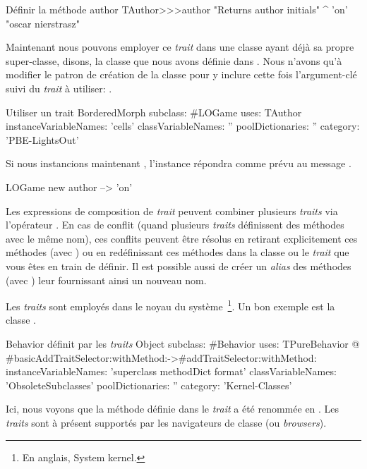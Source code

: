\documentclass[a4paper,10pt,twoside]{book}
\begin{document}
\begin{method}[author]{Définir la méthode author}
TAuthor>>>author
    "Returns author initials"
	^ 'on'    "oscar nierstrasz"
\end{method}

\noindent
Maintenant nous pouvons employer ce \emph{trait} dans une classe ayant déjà sa propre super-classe, disons, la classe  que nous avons définie dans .
Nous n'avons qu'à modifier le patron de création de la classe  pour y inclure cette fois l'argument-clé  suivi du \emph{trait} à utiliser: .

\begin{classdef}[sbegamewithtrait]{Utiliser un trait}
BorderedMorph subclass: #LOGame
	uses: TAuthor
	instanceVariableNames: 'cells'
	classVariableNames: ''
	poolDictionaries: ''
	category: 'PBE-LightsOut'
\end{classdef}

Si nous instancions maintenant , l'instance répondra comme prévu au message .

\begin{code}{}
LOGame new author --> 'on'
\end{code}

Les expressions de composition de \emph{trait} peuvent combiner plusieurs \emph{traits} via l'opérateur \ct{+}.
En cas de conflit (\ie quand plusieurs \emph{traits} définissent des méthodes avec le même nom), ces conflits peuvent être résolus en retirant explicitement ces méthodes (avec \ct{-}) ou en redéfinissant ces méthodes dans la classe ou le \emph{trait} que vous êtes en train de définir.
Il est possible aussi de créer un \emph{alias} des méthodes (avec ) 
leur fournissant ainsi un nouveau nom.

Les \emph{traits} sont employés dans le noyau du système~\footnote{En anglais, System kernel.}.
Un bon exemple est la classe \mbox{.}

\begin{classdef}[behaviorwithtraits]{Behavior définit par les \emph{traits}}
Object subclass: #Behavior
	uses: TPureBehavior @ {#basicAddTraitSelector:withMethod:->#addTraitSelector:withMethod:}
	instanceVariableNames: 'superclass methodDict format'
	classVariableNames: 'ObsoleteSubclasses'
	poolDictionaries: ''
	category: 'Kernel-Classes'
\end{classdef}
\noindent
Ici, nous voyons que la méthode  définie dans le \emph{trait}  a été renommée en \mbox{.}
Les \emph{traits} sont à présent supportés par les navigateurs de classe (ou \emph{browsers}).
\end{document}

